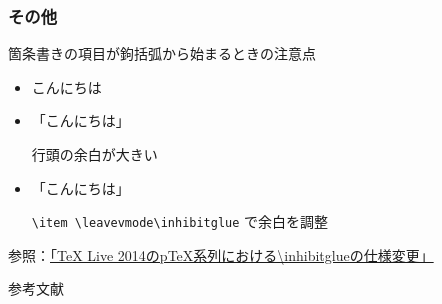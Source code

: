 \documentclass[%
    hyperref={%
        colorlinks,
        linkcolor=sDarkBlue,
        urlcolor=sDarkBlue,
        citecolor=sDarkBlue
    },
    aspectratio=169
]{beamer}
\begin{document}
    \begin{frame}
        \frametitle{その他}
        箇条書きの項目が鉤括弧から始まるときの注意点
        \begin{itemize}
            \item こんにちは
            \item 「こんにちは」

                行頭の余白が大きい
            \item \leavevmode\inhibitglue 「こんにちは」

                \texttt{\textbackslash item \textbackslash leavevmode\textbackslash inhibitglue} で余白を調整
        \end{itemize}

        \bigskip

        参照：\href{http://doratex.hatenablog.jp/entry/20140714/1405302796}{「TeX Live 2014のpTeX系列における\textbackslash inhibitglueの仕様変更」}
    \end{frame}

    \begin{frame}{参考文献}

        \begin{columns}
            \begin{column}{0.95\textwidth}  %
                \printbibliography[title={参考文献}]  %
            \end{column}
        \end{columns}

    \end{frame}
\end{document}
